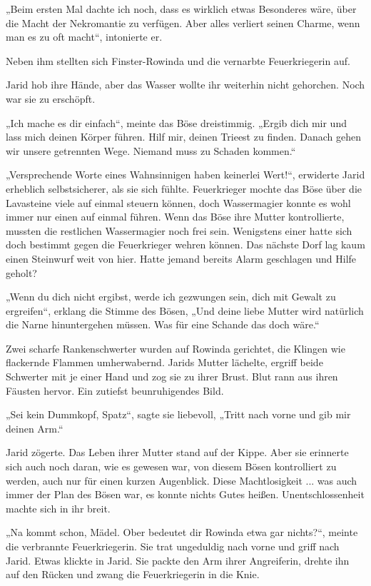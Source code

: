 „Beim ersten Mal dachte ich noch, dass es wirklich etwas Besonderes wäre, über die Macht der Nekromantie zu verfügen. Aber alles verliert seinen Charme, wenn man es zu oft macht“, intonierte er.

Neben ihm stellten sich Finster-Rowinda und die vernarbte Feuerkriegerin auf.

Jarid hob ihre Hände, aber das Wasser wollte ihr weiterhin nicht gehorchen. Noch war sie zu erschöpft.

„Ich mache es dir einfach“, meinte das Böse dreistimmig. „Ergib dich mir und lass mich deinen Körper führen. Hilf mir, deinen Trieest zu finden. Danach gehen wir unsere getrennten Wege. Niemand muss zu Schaden kommen.“

„Versprechende Worte eines Wahnsinnigen haben keinerlei Wert!“, erwiderte Jarid erheblich selbstsicherer, als sie sich fühlte. Feuerkrieger mochte das Böse über die Lavasteine viele auf einmal steuern können, doch Wassermagier konnte es wohl immer nur einen auf einmal führen. Wenn das Böse ihre Mutter kontrollierte, mussten die restlichen Wassermagier noch frei sein. Wenigstens einer hatte sich doch bestimmt gegen die Feuerkrieger wehren können. Das nächste Dorf lag kaum einen Steinwurf weit von hier. Hatte jemand bereits Alarm geschlagen und Hilfe geholt?

„Wenn du dich nicht ergibst, werde ich gezwungen sein, dich mit Gewalt zu ergreifen“, erklang die Stimme des Bösen, „Und deine liebe Mutter wird natürlich die Narne hinuntergehen müssen. Was für eine Schande das doch wäre.“

Zwei scharfe Rankenschwerter wurden auf Rowinda gerichtet, die Klingen wie flackernde Flammen umherwabernd. Jarids Mutter lächelte, ergriff beide Schwerter mit je einer Hand und zog sie zu ihrer Brust. Blut rann aus ihren Fäusten hervor. Ein zutiefst beunruhigendes Bild.

„Sei kein Dummkopf, Spatz“, sagte sie liebevoll, „Tritt nach vorne und gib mir deinen Arm.“

Jarid zögerte. Das Leben ihrer Mutter stand auf der Kippe. Aber sie erinnerte sich auch noch daran, wie es gewesen war, von diesem Bösen kontrolliert zu werden, auch nur für einen kurzen Augenblick. Diese Machtlosigkeit ... was auch immer der Plan des Bösen war, es konnte nichts Gutes heißen. Unentschlossenheit machte sich in ihr breit.

„Na kommt schon, Mädel. Ober bedeutet dir Rowinda etwa gar nichts?“, meinte die verbrannte Feuerkriegerin. Sie trat ungeduldig nach vorne und griff nach Jarid. Etwas klickte in Jarid. Sie packte den Arm ihrer Angreiferin, drehte ihn auf den Rücken und zwang die Feuerkriegerin in die Knie.

